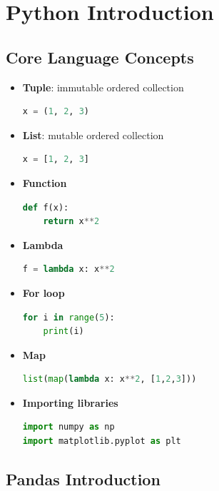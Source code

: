 \documentclass[12pt,oneside]{book}
\numberwithin{equation}{section}
\theoremstyle{definition}
\theoremstyle{plain}
\theoremstyle{remark}
\begin{document}
\section{Python Introduction}

\subsection{Core Language Concepts}

\begin{itemize}
    \item \textbf{Tuple}: immutable ordered collection
\begin{lstlisting}[language=Python]
x = (1, 2, 3)
\end{lstlisting}

    \item \textbf{List}: mutable ordered collection
\begin{lstlisting}[language=Python]
x = [1, 2, 3]
\end{lstlisting}

    \item \textbf{Function}
\begin{lstlisting}[language=Python]
def f(x):
    return x**2
\end{lstlisting}

    \item \textbf{Lambda}
\begin{lstlisting}[language=Python]
f = lambda x: x**2
\end{lstlisting}

    \item \textbf{For loop}
\begin{lstlisting}[language=Python]
for i in range(5):
    print(i)
\end{lstlisting}

    \item \textbf{Map}
\begin{lstlisting}[language=Python]
list(map(lambda x: x**2, [1,2,3]))
\end{lstlisting}

    \item \textbf{Importing libraries}
\begin{lstlisting}[language=Python]
import numpy as np
import matplotlib.pyplot as plt
\end{lstlisting}
\end{itemize}

\subsection{Pandas Introduction}
\end{document}
